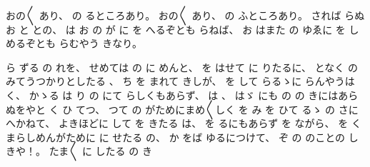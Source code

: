 
%
おの〳〵
あり、
%
の
るところあり。
%
おの〳〵
あり、
%
の
ふところあり。
%
されば
らぬ
お
と
との、
%
は
お
の
が
に
を
へるぞとも
らねば、
%
お
はまた
の
ゆゑに
を
しめるぞとも
らむやう
きなり。

%
ら
ずる
の
れを、
%
せめては
の
に
めんと、
%
を
はせて
に
りたるに、
%
となく
の
みてうつかりとしたる
、
%
ち
を
まれて
きしが、
%
を
して
らるゝに
らんやうは
く、
%
かゝる
は
り
の
にて
らしくもあらず、
%
は
、
%
はゞ
にも
の%
の
きにはあらぬをやと
く
ひ
てつ、
%
つて
の
がためにまめ〳〵しく
を
み
を
ひて
るゝ
の
さに
へかねて、
%
よきほどに
して
を
きたる
は、
%
を
るにもあらず
を%
ながら、
%
を
く
まらしめんがために
に
せたる
の、
%
か
をば
ゆるにつけて、
%
ぞ
の
のことの
しきや！。
%
たま〳〵
に
したる
の
き
